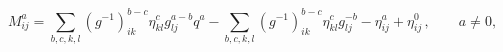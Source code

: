 \begin{equation}
M^a_{ij}=\sum_{b,c,k,l}
(g^{-1})^{b-c}_{ik}\eta^{c}_{kl}g^{a-b}_{lj}q^{a}-
\sum_{b,c,k,l}
(g^{-1})^{b-c}_{ik}\eta^{c}_{kl}g^{-b}_{lj}
-\eta^a_{ij}+\eta^0_{ij}\,,\qquad a\neq 0, 
\label{MM}
\end{equation}

